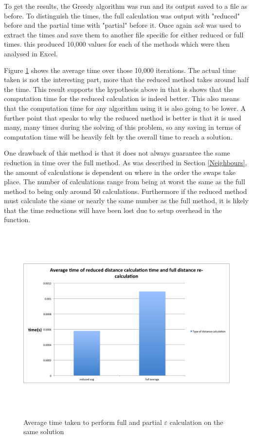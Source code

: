 \documentclass[12pt]{report}
\begin{document}
To get the results, the Greedy algorithm was run and its output saved to a file as before. To distinguish the times, the full calculation was output with "reduced" before and the partial time with "partial" before it. Once again \textit{ack} was used to extract the times and save them to another file specific for either reduced or full times. this produced 10,000 values for each of the methods which were then analysed in Excel.

Figure \ref{f_recalcComparison} shows the average time over those 10,000 iterations. The actual time taken is not the interesting part, more that the reduced method takes around half the time. This result supports the hypothesis above in that is shows that the computation time for the reduced calculation is indeed better. This also means that the computation time for any algorithm using it is also going to be lower. A further point that speaks to why the reduced method is better is that it is used many, many times during the solving of this problem, so any saving in terms of computation time will be heavily felt by the overall time to reach a solution.

One drawback of this method is that it does not always guarantee the same reduction in time over the full method. As was described in Section \ref{Neighbours}, the amount of calculations is dependent on where in the order the swaps take place. The number of calculations range from being at worst the same as the full method to being only around 50 calculations. Furthermore if the reduced method must calculate the same or nearly the same number as the full method, it is likely that the time reductions will have been lost due to setup overhead in the function.

\begin{figure}[H]
\centering
\includegraphics[width=17cm, height=10cm]{../code/misc/reducedvsFullDistanceCalc}
\caption{Average time taken to perform full and partial $\varepsilon$ calculation on the same solution}
\label{f_recalcComparison}
\end{figure}
\end{document}
